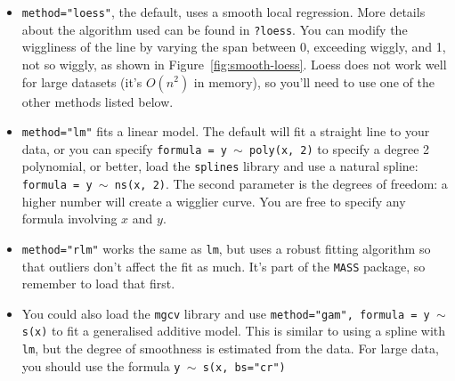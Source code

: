\begin{itemize}
	\item {\tt method="loess"}, the default, uses a smooth local regression.  More details about the algorithm used can be found in {\tt ?loess}.  You can modify the wiggliness of the line by varying the span between 0, exceeding wiggly, and 1, not so wiggly, as shown in Figure~\ref{fig:smooth-loess}.  Loess does not work well for large datasets (it's $O(n^2)$ in memory), so you'll need to use one of the other methods listed below.

    

	\item {\tt method="lm"} fits a linear model.  The default will fit a straight line to your data, or you can specify {\tt formula = y $\sim$ poly(x, 2)} to specify a degree 2 polynomial, or better, load the {\tt splines} library and use a natural spline: {\tt formula = y $\sim$ ns(x, 2)}. The second parameter is the degrees of freedom: a higher number will create a wigglier curve. You are free to specify any formula involving $x$ and $y$.  

    

	\item {\tt method="rlm"} works the same as {\tt lm}, but uses a robust fitting algorithm so that outliers don't affect the fit as much.  It's part of the {\tt MASS} package, so remember to load that first.

	\item You could also load the {\tt mgcv} library and use {\tt method="gam", formula = y $\sim$ s(x)} to fit a generalised additive model.  This is similar 
to using a spline with {\tt lm}, but the degree of smoothness is estimated from the data.  For large data, you should use the formula {\tt y $\sim$ s(x, bs="cr")}
 
    


\end{itemize}

